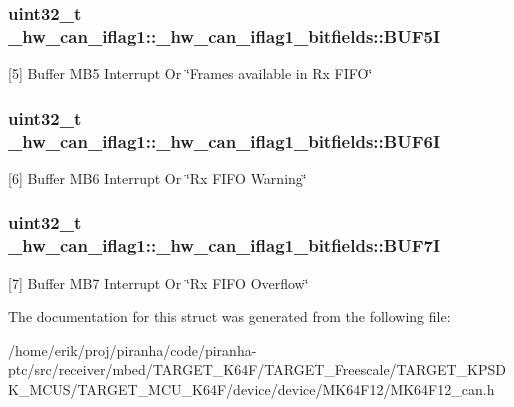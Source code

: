 \subsubsection[{\texorpdfstring{B\+U\+F5I}{BUF5I}}]{\setlength{\rightskip}{0pt plus 5cm}uint32\+\_\+t \+\_\+hw\+\_\+can\+\_\+iflag1\+::\+\_\+hw\+\_\+can\+\_\+iflag1\+\_\+bitfields\+::\+B\+U\+F5I}\hypertarget{struct__hw__can__iflag1_1_1__hw__can__iflag1__bitfields_aac642d250aea73cc3b99a668944d2419}{}\label{struct__hw__can__iflag1_1_1__hw__can__iflag1__bitfields_aac642d250aea73cc3b99a668944d2419}
\mbox{[}5\mbox{]} Buffer M\+B5 Interrupt Or \char`\"{}\+Frames
 available in Rx F\+I\+F\+O\char`\"{} 
\subsubsection[{\texorpdfstring{B\+U\+F6I}{BUF6I}}]{\setlength{\rightskip}{0pt plus 5cm}uint32\+\_\+t \+\_\+hw\+\_\+can\+\_\+iflag1\+::\+\_\+hw\+\_\+can\+\_\+iflag1\+\_\+bitfields\+::\+B\+U\+F6I}\hypertarget{struct__hw__can__iflag1_1_1__hw__can__iflag1__bitfields_a9b41e9b95be928618997853b5f8d5b04}{}\label{struct__hw__can__iflag1_1_1__hw__can__iflag1__bitfields_a9b41e9b95be928618997853b5f8d5b04}
\mbox{[}6\mbox{]} Buffer M\+B6 Interrupt Or \char`\"{}\+Rx F\+I\+F\+O
 Warning\char`\"{} 
\subsubsection[{\texorpdfstring{B\+U\+F7I}{BUF7I}}]{\setlength{\rightskip}{0pt plus 5cm}uint32\+\_\+t \+\_\+hw\+\_\+can\+\_\+iflag1\+::\+\_\+hw\+\_\+can\+\_\+iflag1\+\_\+bitfields\+::\+B\+U\+F7I}\hypertarget{struct__hw__can__iflag1_1_1__hw__can__iflag1__bitfields_a298c0f09857f0b8352efe33fad5b69e8}{}\label{struct__hw__can__iflag1_1_1__hw__can__iflag1__bitfields_a298c0f09857f0b8352efe33fad5b69e8}
\mbox{[}7\mbox{]} Buffer M\+B7 Interrupt Or \char`\"{}\+Rx F\+I\+F\+O
 Overflow\char`\"{} 

The documentation for this struct was generated from the following file\+:\begin{DoxyCompactItemize}
\item 
/home/erik/proj/piranha/code/piranha-\/ptc/src/receiver/mbed/\+T\+A\+R\+G\+E\+T\+\_\+\+K64\+F/\+T\+A\+R\+G\+E\+T\+\_\+\+Freescale/\+T\+A\+R\+G\+E\+T\+\_\+\+K\+P\+S\+D\+K\+\_\+\+M\+C\+U\+S/\+T\+A\+R\+G\+E\+T\+\_\+\+M\+C\+U\+\_\+\+K64\+F/device/device/\+M\+K64\+F12/M\+K64\+F12\+\_\+can.\+h\end{DoxyCompactItemize}
